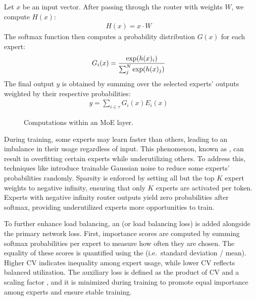 \documentclass[letterpaper,11pt,english]{sphinxmanual}
\begin{document}
\sphinxAtStartPar
Let \(x\) be an input vector. After passing through the router with
weights \(W\), we compute \(H(x)\):
\begin{equation*}
\begin{split}H(x) = x \cdot W\end{split}
\end{equation*}
\sphinxAtStartPar
The softmax function then computes a probability distribution
\(G(x)\) for each expert:
\begin{equation*}
\begin{split}G_i(x) = {\exp(h(x)_i)\over \sum^N_{j} \exp(h(x)_j)}\end{split}
\end{equation*}
\sphinxAtStartPar
The final output \(y\) is obtained by summing over the selected
experts’ outputs weighted by their respective probabilities:
\begin{equation*}
\begin{split}y=\sum_{i\in \tau} G_i(x)E_i(x)\end{split}
\end{equation*}
\begin{figure}[htbp]
\centering
\capstart

\noindent{}
\caption{Computations within an MoE layer.}\label{\detokenize{pretraining:id26}}\end{figure}

\sphinxAtStartPar
During training, some experts may learn faster than others, leading to
an imbalance in their usage regardless of input. This phenomenon, known
as , can result in overfitting certain experts while
underutilizing others. To address this, techniques like 
introduce trainable Gaussian noise to reduce some experts’ probabilities
randomly. Sparsity is enforced by setting all but the top \(K\)
expert weights to negative infinity, ensuring that only \(K\)
experts are activated per token. Experts with negative infinity router
outputs yield zero probabilities after softmax, providing underutilized
experts more opportunities to train.

\sphinxAtStartPar
To further enhance load balancing, an  (or load
balancing loss) is added alongside the primary network loss. First,
importance scores are computed by summing softmax probabilities per
expert to measure how often they are chosen. The equality of these
scores is quantified using the  (i.e. standard
deviation / mean). Higher CV indicates inequality among expert usage,
while lower CV reflects balanced utilization. The auxiliary loss is
defined as the product of CV and a scaling factor , and it is minimized
during training to promote equal importance among experts and ensure
stable training.
\end{document}

